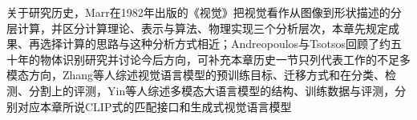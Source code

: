 关于研究历史，Marr在1982年出版的《视觉》把视觉看作从图像到形状描述的分层计算，并区分计算理论、表示与算法、物理实现三个分析层次，本章先规定成果、再选择计算的思路与这种分析方式相近；Andreopoulos与Tsotsos回顾了约五十年的物体识别研究并讨论今后方向，可补充本章历史一节只列代表工作的不足多模态方向，Zhang等人综述视觉语言模型的预训练目标、迁移方式和在分类、检测、分割上的评测，Yin等人综述多模态大语言模型的结构、训练数据与评测，分别对应本章所说CLIP式的匹配接口和生成式视觉语言模型

